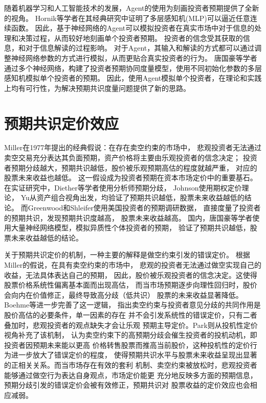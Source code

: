 随着机器学习和人工智能技术的发展，Agent的使用为刻画投资者预期提供了全新的视角。
Hornik等学者在其经典研究中证明了多层感知机(MLP)可以逼近任意连续函数\cite{hornik1989multilayer}。
因此，基于神经网络的Agent可以模拟投资者在真实市场中对于信息的处理和决策过程，从而较好地刻画单个投资者预期。
投资者的信念受其获取的信息\cite{sims2003implications}，和对于信息解读\cite{daniel1998investor}\cite{hong2007disagreement}的过程影响。
对于Agent，其输入和解读的方式都可以通过调整神经网络参数的方式进行模拟，从而更贴合真实投资者的行为。
唐国豪等学者\cite{唐国豪2025投资者预期协同}通过多个神经网络，构建了投资者预期协同度量模型，使用不同初始化参数的多层感知机模拟单个投资者的预期。
因此，使用Agent模拟单个投资者，在理论和实践上均有可行性，为解决预期共识度量问题提供了新的思路。

\section{预期共识定价效应}

Miller在1977年提出的经典假说：在存在卖空约束的市场中，
悲观投资者无法通过卖空交易充分表达其负面预期，资产价格将主要由乐观投资者的信念决定；
投资者预期分歧越大，预期共识越低，股价被乐观预期高估的程度就越严重，
对应的股票未来收益也越低\cite{miller1977risk}。
这一假设成为投资者预期在资本市场定价中的重要基石。
在实证研究中，Diether等学者使用分析师预期分歧\cite{diether2002differences}，
Johnson使用期权定价理论\cite{johnson2004forecast}，
Yu从资产组合视角出发，均验证了预期共识越低，股票未来收益越低的结论。
而Greenwood和Shleifer使用美国投资者的预期调研数据，
直接度量了投资者的预期共识，发现预期共识度越高，
股票未来收益越高\cite{greenwood2014expectations}。
国内，唐国豪等学者使用大量神经网络模型，模拟异质性个体投资者的预期，
验证了预期共识越低，股票未来收益越低的结论\cite{唐国豪2025投资者预期协同}。

关于预期共识定价的机制，一种主要的解释是做空约束引发的错误定价。
根据Miller的假说\cite{miller1977risk}，在具有卖空约束的市场中，
悲观的投资者无法通过做空实现自己的收益，无法具体表达自己的预期，
因此，股价被乐观投资者的信念决定。这使得股票价格系统性偏离基本面而出现高估，
而当市场预期逐步向理性回归时，股价会向内在价值修正，最终导致高分歧（低共识）
股票的未来收益显著降低。Boehme等\cite{boehme2006short}进一步完善了这一逻辑，
指出卖空约束与投资者意见分歧的共同作用是股价高估的必要条件，单一因素的存在
并不会引发系统性的错误定价，只有二者叠加时，悲观投资者的观点缺失才会让乐观
预期主导定价。Park\cite{park2005stock}则从投机性定价视角补充了该机制，
认为卖空约束下的高预期分歧会催生投资者的投机动机，即投资者因预期未来能以更高
价格转售股票而推高当前股价，这种投机性的定价行为进一步放大了错误定价的程度，
使得预期共识水平与股票未来收益呈现出显著的正相关关系。而当市场存在有效的套利
机制、卖空约束被放松时，悲观投资者能够通过做空行为表达自身观点，市场定价能更
充分地反映多方面的预期信息，预期分歧引发的错误定价会被有效修正，预期共识对
股票收益的定价效应也会相应减弱。

